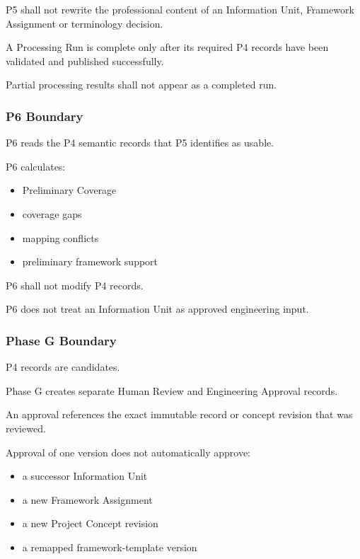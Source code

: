 P5 shall not rewrite the professional content of an Information Unit, Framework Assignment or terminology decision.

A Processing Run is complete only after its required P4 records have been validated and published successfully.

Partial processing results shall not appear as a completed run.

\hypertarget{p6-boundary}{%
\subsubsection{P6 Boundary}\label{p6-boundary}}

P6 reads the P4 semantic records that P5 identifies as usable.

P6 calculates:

\begin{itemize}
\tightlist
\item
  Preliminary Coverage
\item
  coverage gaps
\item
  mapping conflicts
\item
  preliminary framework support
\end{itemize}

P6 shall not modify P4 records.

P6 does not treat an Information Unit as approved engineering input.

\hypertarget{phase-g-boundary}{%
\subsubsection{Phase G Boundary}\label{phase-g-boundary}}

P4 records are candidates.

Phase G creates separate Human Review and Engineering Approval records.

An approval references the exact immutable record or concept revision that was reviewed.

Approval of one version does not automatically approve:

\begin{itemize}
\tightlist
\item
  a successor Information Unit
\item
  a new Framework Assignment
\item
  a new Project Concept revision
\item
  a remapped framework-template version
\end{itemize}

